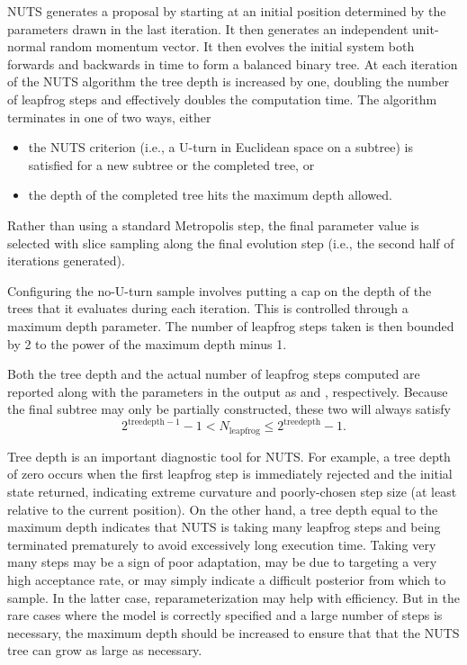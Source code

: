 NUTS generates a proposal by starting at an initial position
determined by the parameters drawn in the last iteration. It then
generates an independent unit-normal random momentum vector. It then
evolves the initial system both forwards and backwards in time to form
a balanced binary tree. At each iteration of the NUTS algorithm the
tree depth is increased by one, doubling the number of leapfrog steps
and effectively doubles the computation time. The algorithm terminates
in one of two ways, either
%
\begin{itemize}
\item the NUTS criterion (i.e., a U-turn in Euclidean space on a
  subtree) is satisfied for a new subtree or the completed tree, or
\item the depth of the completed tree hits the maximum depth allowed.
\end{itemize}
%
Rather than using a standard Metropolis step, the final parameter
value is selected with slice sampling along the final evolution step
(i.e., the second half of iterations generated).

Configuring the no-U-turn sample involves putting a cap on the depth
of the trees that it evaluates during each iteration.   This is
controlled through a maximum depth parameter.   The number of leapfrog
steps taken is then bounded by 2 to the power of the maximum depth minus 1. 

Both the tree depth and the actual number of leapfrog steps computed
are reported along with the parameters in the output as
 and , respectively. Because
the final subtree may only be partially constructed, these two will
always satisfy
%
\[
2^{\mathrm{treedepth} - 1} - 1 < N_{\mathrm{leapfrog}} \le 2^{\mathrm{treedepth} } - 1.
\]

Tree depth is an important diagnostic tool for NUTS. For example, a
tree depth of zero occurs when the first leapfrog step is immediately
rejected and the initial state returned, indicating extreme curvature
and poorly-chosen step size (at least relative to the current
position). On the other hand, a tree depth equal to the maximum depth
indicates that NUTS is taking many leapfrog steps and being terminated
prematurely to avoid excessively long execution time. Taking very many
steps may be a sign of poor adaptation, may be due to targeting a very
high acceptance rate, or may simply indicate a difficult posterior
from which to sample. In the latter case, reparameterization may help
with efficiency. But in the rare cases where the model is correctly
specified and a large number of steps is necessary, the maximum depth
should be increased to ensure that that the NUTS tree can grow as
large as necessary. 


